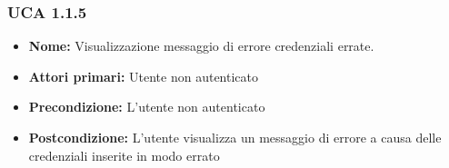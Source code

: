 \documentclass[a4paper, oneside, dvipsnames, table]{article} %
\begin{document}
\subsubsection{UCA 1.1.5}%
\begin{itemize}
\item \textbf{Nome:} Visualizzazione messaggio di errore credenziali errate.
\item \textbf{Attori primari:} Utente non autenticato
\item \textbf{Precondizione:}  L'utente non autenticato
\item \textbf{Postcondizione:} L'utente visualizza un messaggio di errore a causa delle credenziali inserite in modo errato
\end{itemize}
\end{document}
